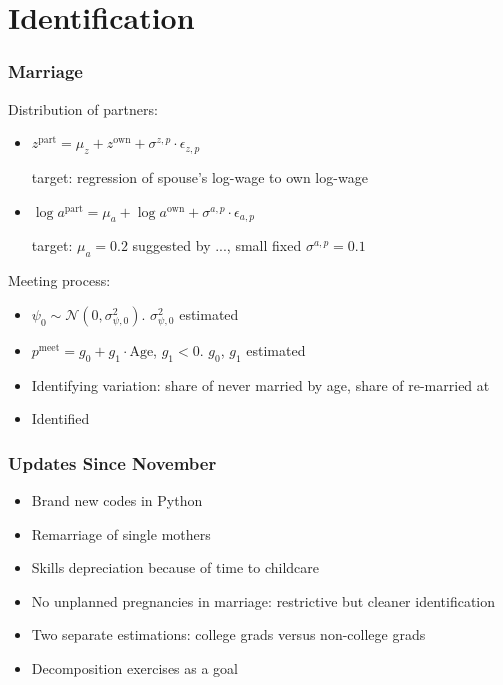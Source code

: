 \documentclass{beamer}
\begin{document}
\section{Identification}

\begin{frame}
\frametitle{Marriage}
Distribution of partners:
\begin{itemize}
\item $z^{\text{part}} = \mu_z +z^{\text{own}} + \sigma^{z,p} \cdot \epsilon_{z,p}$

target: regression of spouse's log-wage to own log-wage
\item $\log a^{\text{part}} = \mu_a + \log a^{\text{own}} + \sigma^{a,p} \cdot \epsilon_{a,p}$

target: $\mu_a = 0.2$ suggested by ..., small fixed $\sigma^{a,p} = 0.1$
\end{itemize}

Meeting process:
\begin{itemize}
\item $\psi_0 \sim \mathcal{N}(0,\sigma^2_{\psi,0})$. $\sigma^2_{\psi,0}$ estimated
\item $p^{\text{meet}} = g_0 + g_1\cdot \text{Age}$, $g_1<0$. $g_0$, $g_1$ estimated
\item Identifying variation: share of never married by age, share of re-married at 
\end{itemize}
\end{frame}

\begin{itemize}
\item Identified 
\end{itemize}




\begin{frame}
\frametitle{Updates Since November}
\begin{itemize}
\item Brand new codes in Python
\item Remarriage of single mothers
\item Skills depreciation because of time to childcare
\item No unplanned pregnancies in marriage: restrictive but cleaner identification
\item Two separate estimations: college grads versus non-college grads
\item Decomposition exercises as a goal
\end{itemize}
\end{frame}
\end{document}
